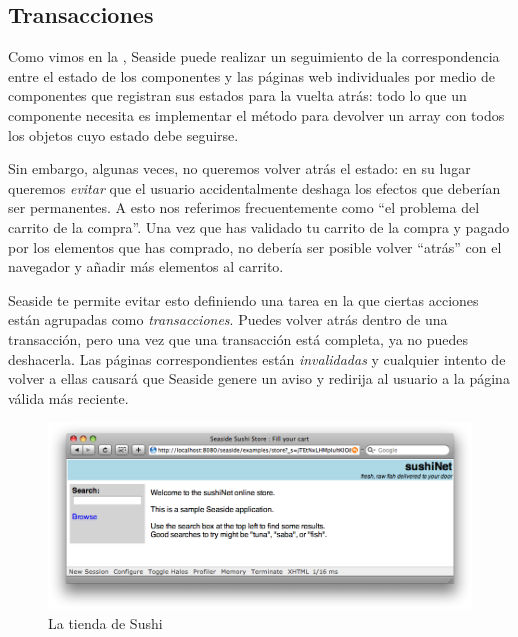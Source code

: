 \documentclass[a4paper,10pt,twoside]{book}
\begin{document}
\subsection{Transacciones}

Como vimos en la , Seaside puede realizar un seguimiento de la correspondencia entre el estado de los componentes y las páginas web individuales por medio de componentes que registran sus estados para la vuelta atrás:
todo lo que un componente necesita es implementar el método  para devolver un array con todos los objetos cuyo estado debe seguirse.

Sin embargo, algunas veces, no queremos volver atrás el estado: en su lugar queremos \emph{evitar} que el usuario accidentalmente deshaga los efectos que deberían ser permanentes.
A esto nos referimos frecuentemente como ``el problema del carrito de la compra''.
Una vez que has validado tu carrito de la compra y pagado por los elementos que has comprado, no debería ser posible volver ``atrás'' con el navegador y añadir más elementos al carrito.

Seaside te permite evitar esto definiendo una tarea en la que ciertas acciones están agrupadas como \emph{transacciones}.
Puedes volver atrás dentro de una transacción, pero una vez que una transacción está completa, ya no puedes deshacerla.
Las páginas correspondientes están \emph{invalidadas} y cualquier intento de volver a ellas causará que Seaside genere un aviso y redirija al usuario a la página válida más reciente.

\begin{figure}[ht]
\begin{center}
\includegraphics[width=\textwidth]{sushiStore}
\caption{La tienda de Sushi}
\end{center}
\end{figure}
\end{document}
